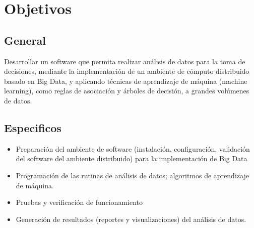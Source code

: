 
\section{Objetivos}
\subsection{General}
Desarrollar un software que permita realizar análisis de datos para la toma de decisiones, mediante la implementación de un
ambiente de cómputo distribuido basado en Big Data, y aplicando técnicas de aprendizaje de máquina (machine
learning), como reglas de asociación y árboles de decisión, a grandes volúmenes de datos.
\subsection{Especificos}
\begin{itemize}
\item Preparación del ambiente de software (instalación, configuración, validación del software del ambiente distribuido) para la
implementación de Big Data
\item Programación de las rutinas de análisis de datos; algoritmos de aprendizaje de máquina.
\item Pruebas y verificación de funcionamiento
\item Generación de resultados (reportes y visualizaciones) del análisis de datos.
\end{itemize}
